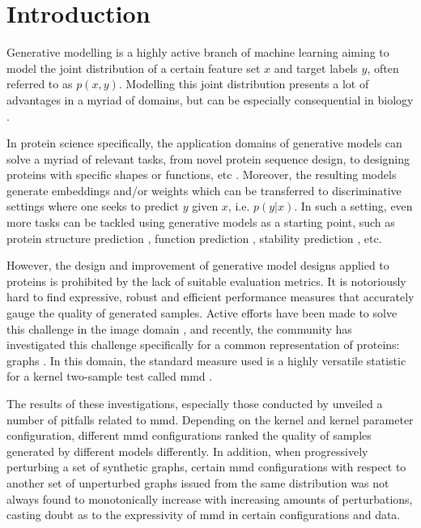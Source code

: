 \chapter{Introduction}


Generative modelling is a highly active branch of machine learning aiming to
model the joint distribution of a certain feature set $x$ and target labels $y$,
often referred to as $p(x,y)$. Modelling this joint distribution presents a lot
of advantages in a myriad of domains, but can be especially
consequential in biology \citep{lopez2020enhancing,strokach2022deep}.

In protein science specifically, the application domains of generative models
can solve a myriad of relevant tasks, from novel protein sequence design, to
designing proteins with specific shapes or functions, etc
\citep{jendrusch2021alphadesign,madani2021deep}. Moreover, the resulting models generate
embeddings and/or weights which can be transferred to discriminative settings
where one seeks to predict $y$ given $x$, i.e. $p(y|x)$. In such a setting, even
more tasks can be tackled using generative models as a starting point, such as protein
structure prediction \citep{jumper2021highly}, function prediction
\citep{meier2021language}, stability prediction \citep{strokach2020fast}, etc.

However, the design and improvement of generative model designs applied to
proteins is prohibited by the lack of suitable evaluation metrics. It is
notoriously hard to find expressive, robust and efficient performance measures
that accurately gauge the quality of generated samples. Active efforts have been
made to solve this challenge in the image domain \citep{heusel2017gans}, and
recently, the community has investigated this challenge specifically for a
common representation of proteins: graphs \citep{thompson2022evaluation,
o2021evaluation}. In this domain, the standard measure used is a highly
versatile statistic for a kernel two-sample test called \acrfull{mmd}
\citep{gretton2012kernel}.

The results of these investigations, especially those conducted by
\cite{o2021evaluation} unveiled a number of pitfalls related to \acrshort{mmd}. Depending
on the kernel and kernel parameter configuration, different \acrshort{mmd} configurations
ranked the quality of samples generated by different models differently. In
addition, when progressively perturbing a set of synthetic graphs, certain \acrshort{mmd}
configurations with respect to another set of unperturbed graphs issued from the
same distribution was not always found to monotonically increase with increasing
amounts of perturbations, casting doubt as to the expressivity of \acrshort{mmd} in certain
configurations and data.

